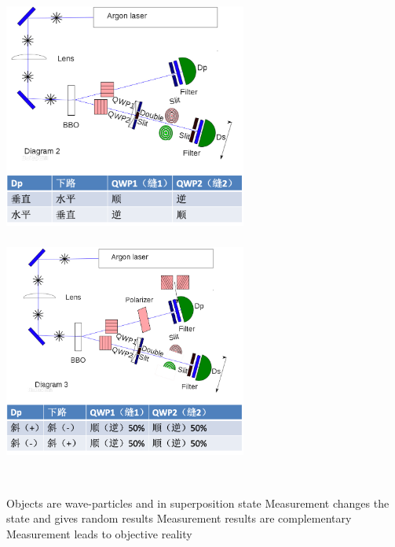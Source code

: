 \begin{frame}
    \frametitle{}
    \begin{center}
        \includegraphics[width=0.6\textwidth]{figs/c2.png} \\
    \end{center} 
\end{frame}

\begin{frame}
    \frametitle{}
    \begin{center}
        \includegraphics[width=0.6\textwidth]{figs/c3.png} \\
    \end{center} 
\end{frame}

\begin{frame}
    \begin{tcolorbox4}[Conclusion]
        ~~\\
    \begin{enumerate}
        \Item Objects are wave-particles and in superposition state
        \Item Measurement changes the state and gives random results
        \Item Measurement results are complementary
        \Item Measurement leads to objective reality
    \end{enumerate}
    \end{tcolorbox4}
\end{frame}

